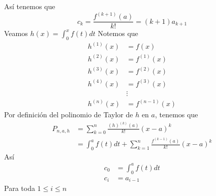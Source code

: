 \documentclass[a4paper]{article}
\begin{document}
Así tenemos que 
\[
    c_{k} = \frac{f^{(k + 1)}(a)}{k!} = (k + 1)a_{k + 1}
\]
Veamos \(h(x) = \displaystyle \int_{0}^{x} f(t) dt\)
\newline 
Notemos que 
\begin{align*}
    h^{(1)}(x) &= f(x) \\
    h^{(2)}(x) &= f^{(1)}(x) \\
    h^{(3)}(x) &= f^{(2)}(x) \\
    h^{(4)}(x) &= f^{(3)}(x) \\
    &\vdots \\
    h^{(n)}(x) &= f^{(n - 1)}(x)
\end{align*} 
Por definición del polinomio de Taylor de \(h\) en \(a\), tenemos que 
\begin{align*}
    P_{n, a, h} &= \sum_{k = 0}^{n} \frac{\left(h\right)^{(k)}(a)}{k!}(x - a)^k \\ 
                 &= \int_{0}^{a} f(t) dt + \sum_{k = 1}^{n} \frac{f^{(k - 1)}(a)}{k!}(x - a)^k
\end{align*}
Así 
\begin{align*}
    c_{0} &= \int_{0}^{a} f(t) dt \\
    c_{i} &= a_{i - 1}
\end{align*}
Para toda \(1 \leq i \leq n\)
\end{document}
